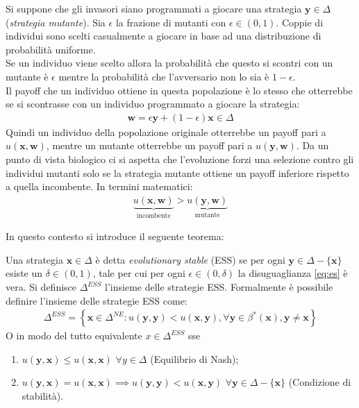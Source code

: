 Si suppone che gli invasori siano programmati a giocare una strategia $\mathbf{y} \in \Delta$ (\emph{strategia mutante}). Sia $\epsilon$ la frazione di mutanti con $\epsilon \in (0, 1)$. Coppie di individui sono scelti casualmente a giocare in base ad una distribuzione di probabilità uniforme. \\

Se un individuo viene scelto allora la probabilità che questo si scontri con un mutante è $\epsilon$ mentre la probabilità che l’avversario non lo sia è $1 - \epsilon$. \\

Il payoff che un individuo ottiene in questa popolazione è lo stesso che otterrebbe se si scontrasse con un individuo programmato a giocare la strategia:
\begin{align*}
    \mathbf{w} = \epsilon \mathbf{y} + (1 - \epsilon) \mathbf{x} \in \Delta
\end{align*}
Quindi un individuo della popolazione originale otterrebbe un payoff pari a $u(\mathbf{x}, \mathbf{w})$, mentre un mutante otterrebbe un payoff pari a $u(\mathbf{y}, \mathbf{w})$. Da un punto di vista biologico ci si aspetta che l’evoluzione forzi una selezione contro gli individui mutanti solo se la strategia mutante ottiene un payoff inferiore rispetto a quella incombente. In termini matematici:
\begin{align}
    \underbrace{u(\mathbf{x}, \mathbf{w})}_\textrm{incombente} > \underbrace{u(\mathbf{y}, \mathbf{w})}_\textrm{mutante}\label{eq:es}
\end{align}

In questo contesto si introduce il seguente teorema:
\begin{thm}\label{thm:ess}
    Una strategia $\mathbf{x} \in \Delta$ è detta \emph{evolutionary stable} (ESS) se per ogni $\mathbf{y} \in \Delta - \{ \mathbf{x}\}$ esiste un $\delta \in (0, 1)$, tale per cui per ogni $\epsilon \in (0, \delta)$ la disuguaglianza \eqref{eq:es} è vera. Si definisce $\Delta^{ESS}$ l'insieme delle strategie ESS. Formalmente è possibile definire l'insieme delle strategie ESS come:
    \begin{align*}
        \Delta^{ESS} = \left\{\mathbf{x} \in \Delta^{NE} : u(\mathbf{y}, \mathbf{y}) < u(\mathbf{x}, \mathbf{y}), \forall \mathbf{y} \in \beta^*(\mathbf{x}), \mathbf{y} \neq \mathbf{x} \right\}
    \end{align*}
    O in modo del tutto equivalente $x \in \Delta^{ESS}$ sse
    \begin{enumerate}
        \item $u(\mathbf{y}, \mathbf{x}) \leq u(\mathbf{x}, \mathbf{x})$ \quad $\forall y \in \Delta$ (Equilibrio di Nash);
        \item $u(\mathbf{y}, \mathbf{x}) = u(\mathbf{x},\mathbf{x}) \implies u(\mathbf{y},\mathbf{y}) < u(\mathbf{x},\mathbf{y})$ \quad $\forall \mathbf{y} \in \Delta - \{\mathbf{x}\}$ (Condizione di stabilità).
    \end{enumerate}
\end{thm}

